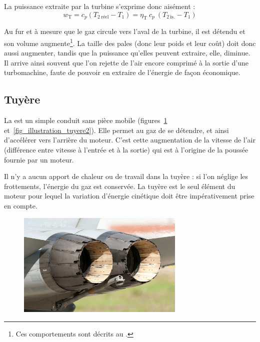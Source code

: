 		La puissance extraite par la turbine s’exprime donc aisément :
		\begin{equation}
			w_\text{T} = c_p (T_{2~\text{réel}} - T_1) =  \eta_\text{T} \ c_p \ (T_{2~\text{is.}} - T_1)
		\end{equation}

		Au fur et à mesure que le gaz circule vers l’aval de la turbine, il est détendu et son volume augmente\footnote{Ces comportements sont décrits au \coursquatre.}\nolinebreak.
		La taille des pales (donc leur poids et leur coût) doit donc aussi augmenter, tandis que la puissance qu’elles peuvent extraire, elle, diminue. Il arrive ainsi souvent que l’on rejette de l’air encore comprimé à la sortie d’une turbomachine, faute de pouvoir en extraire de l’énergie de façon économique.



	\subsection{Tuyère}

		La  est un simple conduit sans pièce mobile (figures~\ref{fig_illustration_tuyere1} et~\ref{fig_illustration_tuyere2}). Elle permet au gaz de se détendre, et ainsi d’accélérer vers l’arrière du moteur. C’est cette augmentation de la vitesse de l’air (différence entre vitesse à l’entrée et à la sortie) qui est à l’origine de la poussée fournie par un moteur.

		Il n’y a aucun apport de chaleur ou de travail dans la tuyère : si l’on néglige les frottements, l’énergie du gaz est conservée. La tuyère est le seul élément du moteur pour lequel la variation d’énergie cinétique doit être impérativement prise en compte.

		\begin{figure}
			\begin{center}
				\includegraphics[width=8cm]{images/photo_tuyere.jpg}
			\end{center}
			\label{fig_illustration_tuyere1}
		\end{figure}

